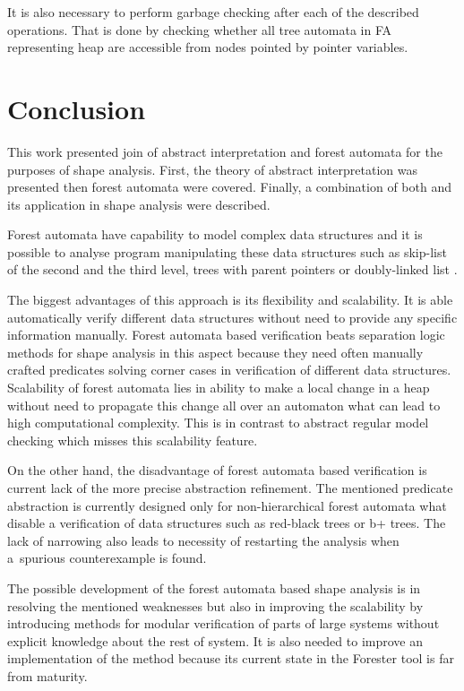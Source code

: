 \documentclass[a4paper, 12pt]{article}
\begin{document}
It is also necessary to perform garbage checking after each of the described operations.
That is done by checking whether all tree automata in FA representing heap are accessible
from nodes pointed by pointer variables.

\section{Conclusion}

This work presented join of abstract interpretation and forest automata
for the purposes of shape analysis.
First, the theory of abstract interpretation was presented
then forest automata were covered.
Finally, a combination of both and its application
in shape analysis were described.

Forest automata have capability to model complex data structures
and it is possible to analyse program manipulating these data structures
such as skip-list of the second and the third level, trees with parent pointers
or doubly-linked list \cite{svcomp15}.

The biggest advantages of this approach is its flexibility and scalability.
It is able automatically verify different data structures without need to
provide any specific information manually.
Forest automata based verification beats separation logic methods for shape analysis
in this aspect because they need often manually crafted predicates
solving corner cases in verification of different data structures.
Scalability of forest automata lies in ability to make a local
change in a heap without need to propagate this change all over
an automaton what can lead to high computational complexity.
This is in contrast to abstract regular model checking which
misses this scalability feature.

On the other hand, the disadvantage of forest automata based verification
is current lack of the more precise abstraction refinement.
The mentioned predicate abstraction is currently designed only for
non-hierarchical forest automata what disable a verification of
data structures such as red-black trees or b+ trees.
The lack of narrowing also leads to necessity of restarting
the analysis when a~spurious counterexample is found.

The possible development of the forest automata based shape analysis
is in resolving the mentioned weaknesses but also in improving
the scalability by introducing methods for modular verification
of parts of large systems without explicit knowledge about the rest of system.
It is also needed to improve an implementation of the method because
its current state in the Forester tool is far from maturity.

\newpage


\end{document}
